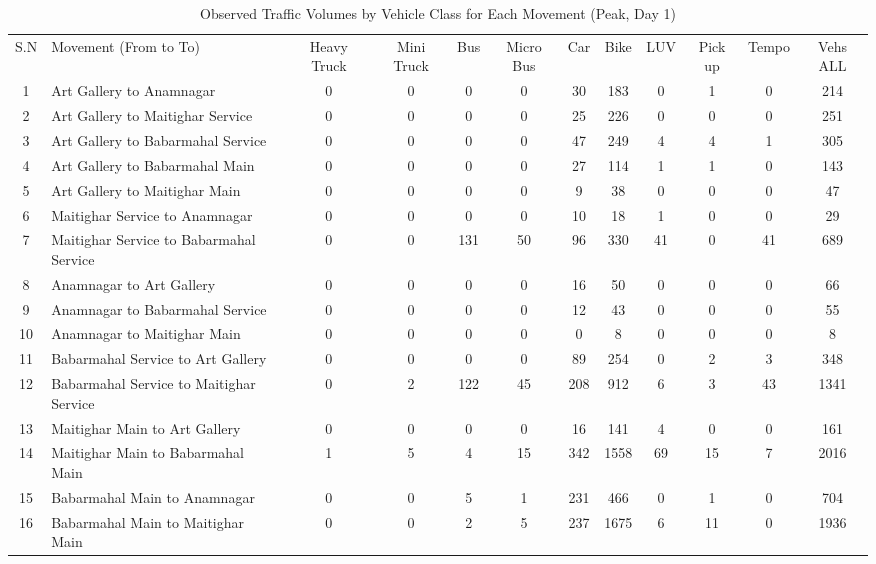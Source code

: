 \begin{landscape}
\begin{table}[h!]
\centering
\caption{Observed Traffic Volumes by Vehicle Class for Each Movement (Peak, Day 1)}
\small
\setlength{\tabcolsep}{5pt}
\begin{tabular}{|c|p{6cm}|c|c|c|c|c|c|c|c|c|c|}
\hline
S.N& Movement (From to To)& Heavy Truck & Mini Truck & Bus & Micro Bus & Car & Bike & LUV & Pick up & Tempo & Vehs ALL \\
1	&Art Gallery to Anamnagar	            &0	&0	&0	&0	&30	    &183	&0	&1	&0	&214 \\ \hline
2	&Art Gallery to Maitighar Service	    &0	&0	&0	&0	&25	    &226	&0	&0	&0	&251 \\ \hline
3	&Art Gallery to Babarmahal Service	    &0	&0	&0	&0	&47	    &249	&4	&4	&1	&305 \\ \hline
4	&Art Gallery to Babarmahal Main	        &0	&0	&0	&0	&27	    &114	&1	&1	&0	&143 \\ \hline
5	&Art Gallery to Maitighar Main	        &0	&0	&0	&0	&9	    &38	&0 &0	&0	&47 \\ \hline
6	&Maitighar Service to Anamnagar	         &0	&0	&0	&0	&10	    &18	&1 &0	&0	&29 \\ \hline
7	&Maitighar Service to Babarmahal Service &0	&0	&131	&50	    &96	&330	&41	&0	&41	&689 \\ \hline
8	&Anamnagar to Art Gallery	            &0	&0	&0	&0	&16	    &50	    &0&	0	&0	&66 \\ \hline
9	&Anamnagar to Babarmahal Service	     &0	&0	&0	&0	&12	    &43	&0 &	0	&0	&55 \\ \hline
10	&Anamnagar to Maitighar Main	         &0	&0	&0	&0	&0	    &8	&0	&0	&0	&8 \\ \hline
11	&Babarmahal Service to Art Gallery	    &0	&0	&0	&0	&89	    &254	&0	&2	&3	&348 \\ \hline
12	&Babarmahal Service to Maitighar Service &0	&2	&122	&45	    &208	&912	&6	&3	&43	&1341 \\ \hline
13	&Maitighar Main to Art Gallery	        &0	&0	&0	&0	&16	    &141	&4	&0	&0	&161 \\ \hline
14	&Maitighar Main to Babarmahal Main	    &1	&5	&4	&15	&342	&1558	&69	&15	&7	&2016 \\ \hline
15	&Babarmahal Main to Anamnagar	        &0	&0	&5	&1	&231	&466	&0	&1	&0	&704 \\ \hline
16	&Babarmahal Main to Maitighar Main	    &0	&0	&2	&5	&237	&1675	&6	&11	&0	&1936 \\ \hline

\end{tabular}
\end{table}
\end{landscape}


